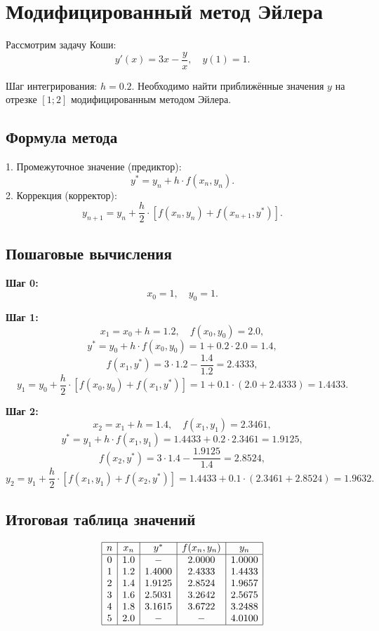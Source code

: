 \documentclass[a4paper,12pt]{article}
\begin{document}
\section{Модифицированный метод Эйлера}


Рассмотрим задачу Коши:
\[
y'(x) = 3x - \frac{y}{x}, \quad y(1) = 1.
\]

Шаг интегрирования: \( h = 0.2 \). Необходимо найти приближённые значения \( y \) на отрезке \([1; 2]\) модифицированным методом Эйлера.

\subsection*{Формула метода}
1. Промежуточное значение (предиктор):
\[
y^* = y_n + h \cdot f(x_n, y_n).
\]
2. Коррекция (корректор):
\[
y_{n+1} = y_n + \frac{h}{2} \cdot \left[f(x_n, y_n) + f(x_{n+1}, y^*)\right].
\]

\subsection*{Пошаговые вычисления}

\textbf{Шаг 0:}
\[
x_0 = 1, \quad y_0 = 1.
\]

\textbf{Шаг 1:}
\[
x_1 = x_0 + h = 1.2, \quad f(x_0, y_0) = 2.0,
\]
\[
y^* = y_0 + h \cdot f(x_0, y_0) = 1 + 0.2 \cdot 2.0 = 1.4,
\]
\[
f(x_1, y^*) = 3 \cdot 1.2 - \frac{1.4}{1.2} = 2.4333,
\]
\[
y_1 = y_0 + \frac{h}{2} \cdot \left[f(x_0, y_0) + f(x_1, y^*)\right] = 1 + 0.1 \cdot (2.0 + 2.4333) = 1.4433.
\]

\textbf{Шаг 2:}
\[
x_2 = x_1 + h = 1.4, \quad f(x_1, y_1) = 2.3461,
\]
\[
y^* = y_1 + h \cdot f(x_1, y_1) = 1.4433 + 0.2 \cdot 2.3461 = 1.9125,
\]
\[
f(x_2, y^*) = 3 \cdot 1.4 - \frac{1.9125}{1.4} = 2.8524,
\]
\[
y_2 = y_1 + \frac{h}{2} \cdot \left[f(x_1, y_1) + f(x_2, y^*)\right] = 1.4433 + 0.1 \cdot (2.3461 + 2.8524) = 1.9632.
\]

\subsection*{Итоговая таблица значений}

\[
\begin{array}{|c|c|c|c|c|}
\hline
n & x_n & y^* & f(x_n, y_n) & y_n \\ \hline
0 & 1.0 & - & 2.0000 & 1.0000 \\ 
1 & 1.2 & 1.4000 & 2.4333 & 1.4433 \\ 
2 & 1.4 & 1.9125 & 2.8524 & 1.9657 \\ 
3 & 1.6 & 2.5031 & 3.2642 & 2.5675 \\ 
4 & 1.8 & 3.1615 & 3.6722 & 3.2488 \\ 
5 & 2.0 & - & - & 4.0100 \\ \hline
\end{array}
\]
\end{document}

